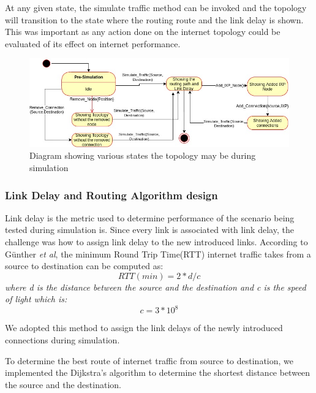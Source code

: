 At any given state, the simulate traffic method can be invoked and the topology will transition to the state where the routing route and the link delay is shown. This was important as any action done on the internet topology could be evaluated of its effect on internet performance. 
\begin{figure}
    \begin{center}
        \includegraphics[width=1\linewidth]{sections/pictures-diagrams/sequence.jpg}
    \end{center}
    \caption{Diagram showing various states the topology may be during simulation}
    \label{figure:state}
\end{figure}
\subsubsection{Link Delay and Routing Algorithm design}
Link delay is the metric used to determine performance of the scenario being tested during simulation is. Since every link is associated with link delay, the challenge was how to assign link delay to the new introduced links. According to Günther \textit{et al}\cite{RTTT}, the minimum Round Trip Time(RTT) internet traffic takes from a source to destination can be computed as: 
\begin{equation}
RTT(min) = 2*d/c
\end{equation}
\textit{where d is the distance 
between the source and the destination and c is the speed of light which is: }
\begin{equation}
c = 3*10^8
\end{equation}

We adopted this method to assign the link delays of the newly introduced connections during simulation. 

To determine the best route of internet traffic from source to destination, we implemented the Dijkstra's algorithm\cite{SaeediMEJ10} to determine the shortest distance between the source and the destination.  